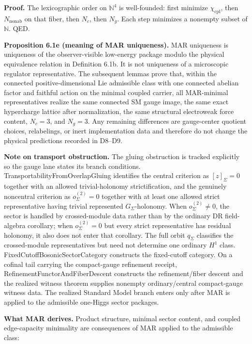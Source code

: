 \textbf{Proof.} The lexicographic order on \(\mathbb N^4\) is well-founded: first minimize \(\chi_{\mathrm{cpl}}\), then \(N_{\mathrm{nonab}}\) on that fiber, then \(N_c\), then \(N_g\). Each step minimizes a nonempty subset of \(\mathbb N\). QED.

\textbf{Proposition 6.1e (meaning of MAR uniqueness).} MAR uniqueness is uniqueness of the observer-visible low-energy package modulo the physical equivalence relation in Definition 6.1b. It is not uniqueness of a microscopic regulator representative. The subsequent lemmas prove that, within the connected positive-dimensional Lie admissible class with one connected abelian factor and faithful action on the minimal coupled carrier, all MAR-minimal representatives realize the same connected SM gauge image, the same exact hypercharge lattice after normalization, the same structural electroweak force content, \(N_c=3\), and \(N_g=3\). Any remaining differences are gauge-center quotient choices, relabelings, or inert implementation data and therefore do not change the physical predictions recorded in D8--D9.

\textbf{Note on transport obstruction.} The gluing obstruction is tracked explicitly so the gauge lane states its branch conditions. TransportabilityFromOverlapGluing identifies the central criterion as \([z]_\Sigma=0\) together with an allowed trivial-holonomy strictification, and the genuinely noncentral criterion as \(o^{(2)}_\Sigma=0\) together with at least one allowed strict representative having trivial represented \(G_\Sigma\)-holonomy. When \(o^{(2)}_\Sigma\ne0\), the sector is handled by crossed-module data rather than by the ordinary DR field-algebra corollary; when \(o^{(2)}_\Sigma=0\) but every strict representative has residual holonomy, it also does not enter that corollary. The full orbit \(q_\Sigma\) classifies the crossed-module representatives but need not determine one ordinary \(H^1\) class. FixedCutoffBosonicSectorCategory constructs the fixed-cutoff category. On a cofinal tail carrying the compact-gauge refinement receipt, RefinementFunctorAndFiberDescent constructs the refinement/fiber descent and the realized witness theorem supplies nonempty ordinary/central compact-gauge witness data. The realized Standard Model branch enters only after MAR is applied to the admissible one-Higgs sector packages.

\textbf{What MAR derives.} Product structure, minimal sector content, and coupled edge-capacity minimality are consequences of MAR applied to the admissible class:


